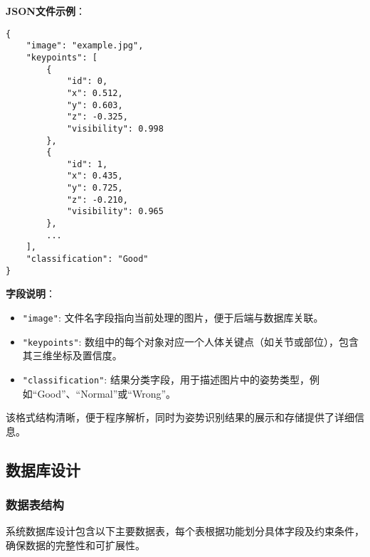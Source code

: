 \textbf{JSON文件示例}：

\begin{lstlisting}
{
    "image": "example.jpg",
    "keypoints": [
        {
            "id": 0,
            "x": 0.512,
            "y": 0.603,
            "z": -0.325,
            "visibility": 0.998
        },
        {
            "id": 1,
            "x": 0.435,
            "y": 0.725,
            "z": -0.210,
            "visibility": 0.965
        },
        ...
    ],
    "classification": "Good"
}
\end{lstlisting}

\textbf{字段说明}：
\begin{itemize}
    \item \texttt{"image"}: 文件名字段指向当前处理的图片，便于后端与数据库关联。
    \item \texttt{"keypoints"}: 数组中的每个对象对应一个人体关键点（如关节或部位），包含其三维坐标及置信度。
    \item \texttt{"classification"}: 结果分类字段，用于描述图片中的姿势类型，例如“Good”、“Normal”或“Wrong”。
\end{itemize}

该格式结构清晰，便于程序解析，同时为姿势识别结果的展示和存储提供了详细信息。


\subsection{数据库设计}

\subsubsection{数据表结构}

系统数据库设计包含以下主要数据表，每个表根据功能划分具体字段及约束条件，确保数据的完整性和可扩展性。

